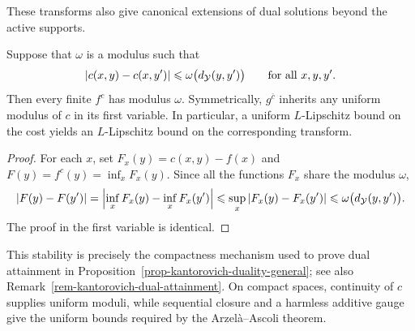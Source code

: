 These transforms also give canonical extensions of dual solutions beyond the active supports.

\begin{prop}\label{prop-c-transform-lipschitz}
	Suppose that $\omega$ is a modulus such that
	\[
		|c(x,y)-c(x,y')|
		\leqslant\omega\bigl(d_{\mathcal{Y}}(y,y')\bigr)
		\qquad\text{for all }x,y,y'.
	\]
	Then every finite $f^c$ has modulus $\omega$. Symmetrically, $g^{\bar c}$ inherits any uniform modulus of $c$ in its first variable. In particular, a uniform $L$-Lipschitz bound on the cost yields an $L$-Lipschitz bound on the corresponding transform.
\end{prop}
\begin{proof}
	For each $x$, set $F_x(y)=c(x,y)-f(x)$ and $F(y)=f^c(y)=\inf_x F_x(y)$. Since all the functions $F_x$ share the modulus $\omega$,
	\[
		|F(y)-F(y')|
		=
		\left|\inf_x F_x(y)-\inf_x F_x(y')\right|
		\leqslant
		\sup_x |F_x(y)-F_x(y')|
		\leqslant
		\omega\bigl(d_{\mathcal{Y}}(y,y')\bigr).
	\]
	The proof in the first variable is identical.
\end{proof}

This stability is precisely the compactness mechanism used to prove dual attainment in Proposition~\ref{prop-kantorovich-duality-general}; see also Remark~\ref{rem-kantorovich-dual-attainment}. On compact spaces, continuity of $c$ supplies uniform moduli, while sequential closure and a harmless additive gauge give the uniform bounds required by the Arzel\`a--Ascoli theorem.

